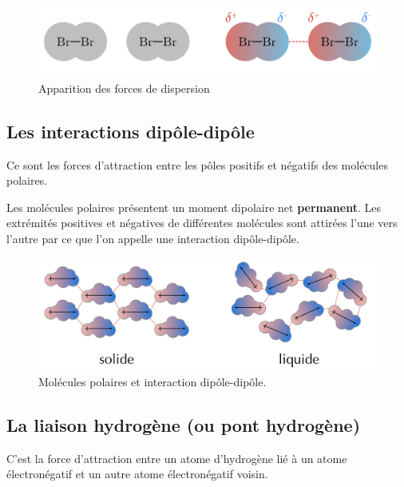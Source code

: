 \documentclass[
  11pt,
  french,
  a4paper,
  openany]{book}
\begin{document}
\begin{figure}

{\centering \includegraphics[width=0.67\linewidth]{images/forces-london} 

}

\caption{Apparition des forces de dispersion}\label{fig:forces-london}
\end{figure}

\hypertarget{les-interactions-dipuxf4le-dipuxf4le}{%
\subsection{Les interactions dipôle-dipôle}\label{les-interactions-dipuxf4le-dipuxf4le}}

Ce sont les forces d'attraction entre les pôles positifs et négatifs des molécules polaires.

Les molécules polaires présentent un moment dipolaire net \textbf{permanent}. Les extrémités positives et négatives de différentes molécules sont attirées l'une vers l'autre par ce que l'on appelle une interaction dipôle-dipôle.

\begin{figure}

{\centering \includegraphics[width=0.67\linewidth]{images/dipole-dipole} 

}

\caption{Molécules polaires et interaction dipôle-dipôle.}\label{fig:dipole-dipole}
\end{figure}

\hypertarget{la-liaison-hydroguxe8ne-ou-pont-hydroguxe8ne}{%
\subsection{La liaison hydrogène (ou pont hydrogène)}\label{la-liaison-hydroguxe8ne-ou-pont-hydroguxe8ne}}

C'est la force d'attraction entre un atome d'hydrogène lié à un atome électronégatif et un autre atome électronégatif voisin.
\end{document}
